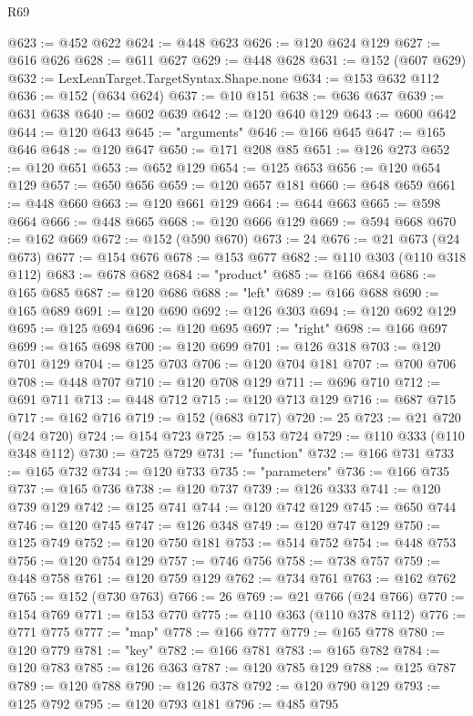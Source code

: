 \begin{lexlean}{R69}
\begin{coremodule}
@623 := @452 @622
@624 := @448 @623
@626 := @120 @624 @129
@627 := @616 @626
@628 := @611 @627
@629 := @448 @628
@631 := @152 (@607 @629)
@632 := LexLeanTarget.TargetSyntax.Shape.none
@634 := @153 @632 @112
@636 := @152 (@634 @624)
@637 := @10 @151
@638 := @636 @637
@639 := @631 @638
@640 := @602 @639
@642 := @120 @640 @129
@643 := @600 @642
@644 := @120 @643
@645 := "arguments"
@646 := @166 @645
@647 := @165 @646
@648 := @120 @647
@650 := @171 @208 @85
@651 := @126 @273
@652 := @120 @651
@653 := @652 @129
@654 := @125 @653
@656 := @120 @654 @129
@657 := @650 @656
@659 := @120 @657 @181
@660 := @648 @659
@661 := @448 @660
@663 := @120 @661 @129
@664 := @644 @663
@665 := @598 @664
@666 := @448 @665
@668 := @120 @666 @129
@669 := @594 @668
@670 := @162 @669
@672 := @152 (@590 @670)
@673 := 24
@676 := @21 @673 (@24 @673)
@677 := @154 @676
@678 := @153 @677
@682 := @110 @303 (@110 @318 @112)
@683 := @678 @682
@684 := "product"
@685 := @166 @684
@686 := @165 @685
@687 := @120 @686
@688 := "left"
@689 := @166 @688
@690 := @165 @689
@691 := @120 @690
@692 := @126 @303
@694 := @120 @692 @129
@695 := @125 @694
@696 := @120 @695
@697 := "right"
@698 := @166 @697
@699 := @165 @698
@700 := @120 @699
@701 := @126 @318
@703 := @120 @701 @129
@704 := @125 @703
@706 := @120 @704 @181
@707 := @700 @706
@708 := @448 @707
@710 := @120 @708 @129
@711 := @696 @710
@712 := @691 @711
@713 := @448 @712
@715 := @120 @713 @129
@716 := @687 @715
@717 := @162 @716
@719 := @152 (@683 @717)
@720 := 25
@723 := @21 @720 (@24 @720)
@724 := @154 @723
@725 := @153 @724
@729 := @110 @333 (@110 @348 @112)
@730 := @725 @729
@731 := "function"
@732 := @166 @731
@733 := @165 @732
@734 := @120 @733
@735 := "parameters"
@736 := @166 @735
@737 := @165 @736
@738 := @120 @737
@739 := @126 @333
@741 := @120 @739 @129
@742 := @125 @741
@744 := @120 @742 @129
@745 := @650 @744
@746 := @120 @745
@747 := @126 @348
@749 := @120 @747 @129
@750 := @125 @749
@752 := @120 @750 @181
@753 := @514 @752
@754 := @448 @753
@756 := @120 @754 @129
@757 := @746 @756
@758 := @738 @757
@759 := @448 @758
@761 := @120 @759 @129
@762 := @734 @761
@763 := @162 @762
@765 := @152 (@730 @763)
@766 := 26
@769 := @21 @766 (@24 @766)
@770 := @154 @769
@771 := @153 @770
@775 := @110 @363 (@110 @378 @112)
@776 := @771 @775
@777 := "map"
@778 := @166 @777
@779 := @165 @778
@780 := @120 @779
@781 := "key"
@782 := @166 @781
@783 := @165 @782
@784 := @120 @783
@785 := @126 @363
@787 := @120 @785 @129
@788 := @125 @787
@789 := @120 @788
@790 := @126 @378
@792 := @120 @790 @129
@793 := @125 @792
@795 := @120 @793 @181
@796 := @485 @795

\end{coremodule}
\end{lexlean}
